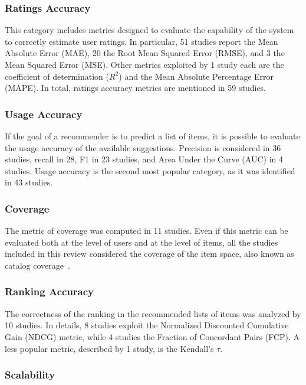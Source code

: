 \subsubsection{Ratings Accuracy}

This category includes metrics designed to evaluate the capability of the system to correctly estimate user ratings. In particular, 51 studies report the Mean Absolute Error (MAE), 20 the Root Mean Squared Error (RMSE), and 3 the Mean Squared Error (MSE). Other metrics exploited by 1 study each are the coefficient of determination ($R^2$) and the Mean Absolute Percentage Error (MAPE). In total, ratings accuracy metrics are mentioned in 59 studies.

\subsubsection{Usage Accuracy}

If the goal of a recommender is to predict a list of items, it is possible to evaluate the usage accuracy of the available suggestions. Precision is considered in 36 studies, recall in 28, F1 in 23 studies, and Area Under the Curve (AUC) in 4 studies. Usage accuracy is the second most popular category, as it was identified in 43 studies.

\subsubsection{Coverage}

The metric of coverage was computed in 11 studies. Even if this metric can be evaluated both at the level of users and at the level of items, all the studies included in this review considered the coverage of the item space, also known as catalog coverage~\cite{Herlocker2004}.

\subsubsection{Ranking Accuracy}

The correctness of the ranking in the recommended lists of items was analyzed by 10 studies. In details, 8 studies exploit the Normalized Discounted Cumulative Gain (NDCG) metric, while 4 studies the Fraction of Concordant Pairs (FCP). A less popular metric, described by 1 study, is the Kendall's $\tau$.

\subsubsection{Scalability}

